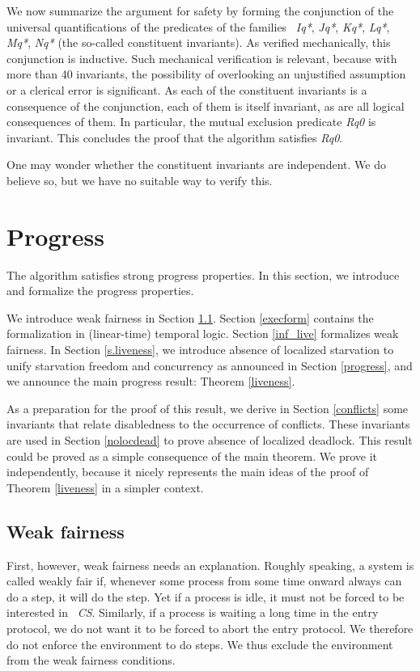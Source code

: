 \documentclass[10pt]{article} \usepackage[english]{babel}
\def\S #1/{\mbox {\textsl{#1}}}
\begin{document}
We now summarize the argument for safety by forming the conjunction of
the universal quantifications of the predicates of the families \S
Iq*/, \S Jq*/, \S Kq*/, \S Lq*/, \S Mq*/, \S Nq*/ (the so-called
constituent invariants).  As verified mechanically, this conjunction
is inductive.  Such mechanical verification is relevant, because with
more than 40 invariants, the possibility of overlooking an unjustified
assumption or a clerical error is significant.  As each of the
constituent invariants is a consequence of the conjunction, each of
them is itself invariant, as are all logical consequences of them. In
particular, the mutual exclusion predicate \S Rq0/ is invariant.  This
concludes the proof that the algorithm satisfies \S Rq0/.

One may wonder whether the constituent invariants are independent. We
do believe so, but we have no suitable way to verify this. 

\section{Progress} \label{nodead}

The algorithm satisfies strong progress properties.  In this
section, we introduce and formalize the progress properties.

We introduce weak fairness in Section \ref{intro-wf}.  Section
\ref{execform} contains the formalization in (linear-time) temporal
logic.  Section \ref{inf_live} formalizes weak fairness.  
In Section \ref {s.liveness}, we introduce absence of localized
starvation to unify starvation freedom and concurrency as announced in
Section \ref{progress}, and we announce the main progress result: 
Theorem \ref{liveness}. 

As a preparation for the proof of this result, we derive in Section
\ref{conflicts} some invariants that relate disabledness to the
occurrence of conflicts.  These invariants are used in Section
\ref{nolocdead} to prove absence of localized deadlock.  This result
could be proved as a simple consequence of the main theorem.  We prove
it independently, because it nicely represents the main ideas of the
proof of Theorem \ref{liveness} in a simpler context.

\subsection{Weak fairness} \label{intro-wf}

First, however, weak fairness needs an explanation.  Roughly speaking,
a system is called weakly fair if, whenever some process from some
time onward always can do a step, it will do the step.  Yet if a
process is idle, it must not be forced to be interested in \S
CS/. Similarly, if a process is waiting a long time in the entry
protocol, we do not want it to be forced to abort the entry
protocol. We therefore do not enforce the environment to do steps.  We
thus exclude the environment from the weak fairness conditions.
\end{document}
